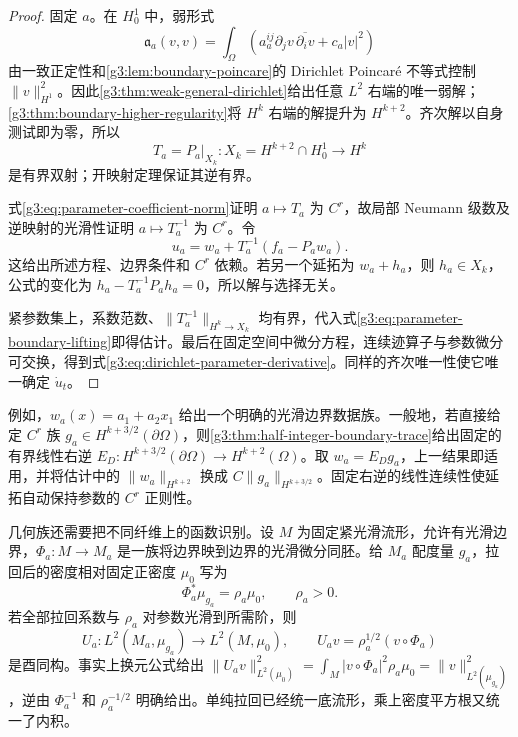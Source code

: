 \begin{proof}
	固定 \(a\)。在 \(H^1_0\) 中，弱形式
	\[
		\mathfrak a_a(v,v)=\int_\Omega
		\left(a_a^{ij}\partial_jv\,\overline{\partial_iv}+c_a|v|^2\right)
	\]
	由一致正定性和\cref{g3:lem:boundary-poincare}的 Dirichlet Poincar\'e 不等式控制 \(\|v\|_{H^1}^2\)。因此\cref{g3:thm:weak-general-dirichlet}给出任意 \(L^2\) 右端的唯一弱解；\cref{g3:thm:boundary-higher-regularity}将 \(H^k\) 右端的解提升为 \(H^{k+2}\)。齐次解以自身测试即为零，所以
	\[
		T_a=P_a|_{X_k}:X_k=H^{k+2}\cap H^1_0\longrightarrow H^k
	\]
	是有界双射；开映射定理保证其逆有界。

	式\eqref{g3:eq:parameter-coefficient-norm}证明 \(a\mapsto T_a\) 为 \(C^r\)，故局部 Neumann 级数及逆映射的光滑性证明 \(a\mapsto T_a^{-1}\) 为 \(C^r\)。令
	\begin{equation}\label{g3:eq:parameter-boundary-lifting}
		u_a=w_a+T_a^{-1}(f_a-P_aw_a).
	\end{equation}
	这给出所述方程、边界条件和 \(C^r\) 依赖。若另一个延拓为 \(w_a+h_a\)，则 \(h_a\in X_k\)，公式的变化为
	\(h_a-T_a^{-1}P_ah_a=0\)，所以解与选择无关。

	紧参数集上，系数范数、\(\|T_a^{-1}\|_{H^k\to X_k}\) 均有界，代入式\eqref{g3:eq:parameter-boundary-lifting}即得估计。最后在固定空间中微分方程，连续迹算子与参数微分可交换，得到式\eqref{g3:eq:dirichlet-parameter-derivative}。同样的齐次唯一性使它唯一确定 \(\dot u_t\)。
\end{proof}

例如，\(w_a(x)=a_1+a_2x_1\) 给出一个明确的光滑边界数据族。一般地，若直接给定 \(C^r\) 族 \(g_a\in H^{k+3/2}(\partial\Omega)\)，则\cref{g3:thm:half-integer-boundary-trace}给出固定的有界线性右逆 \(E_D:H^{k+3/2}(\partial\Omega)\to H^{k+2}(\Omega)\)。取 \(w_a=E_Dg_a\)，上一结果即适用，并将估计中的 \(\|w_a\|_{H^{k+2}}\) 换成 \(C\|g_a\|_{H^{k+3/2}}\)。固定右逆的线性连续性使延拓自动保持参数的 \(C^r\) 正则性。

\ProseParagraphBreak

几何族还需要把不同纤维上的函数识别。设 \(M\) 为固定紧光滑流形，允许有光滑边界，\(\Phi_a:M\to M_a\) 是一族将边界映到边界的光滑微分同胚。给 \(M_a\) 配度量 \(g_a\)，拉回后的密度相对固定正密度 \(\mu_0\) 写为
\[
	\Phi_a^*\mu_{g_a}=\rho_a\mu_0,\qquad \rho_a>0.
\]
若全部拉回系数与 \(\rho_a\) 对参数光滑到所需阶，则
\begin{equation}\label{g3:eq:geometric-unitary-identification}
	U_a:L^2(M_a,\mu_{g_a})\longrightarrow L^2(M,\mu_0),
	\qquad U_av=\rho_a^{1/2}(v\circ\Phi_a)
\end{equation}
是酉同构。事实上换元公式给出
\(\|U_av\|_{L^2(\mu_0)}^2=\int_M|v\circ\Phi_a|^2\rho_a\mu_0=\|v\|_{L^2(\mu_{g_a})}^2\)，逆由 \(\Phi_a^{-1}\) 和 \(\rho_a^{-1/2}\) 明确给出。单纯拉回已经统一底流形，乘上密度平方根又统一了内积。


